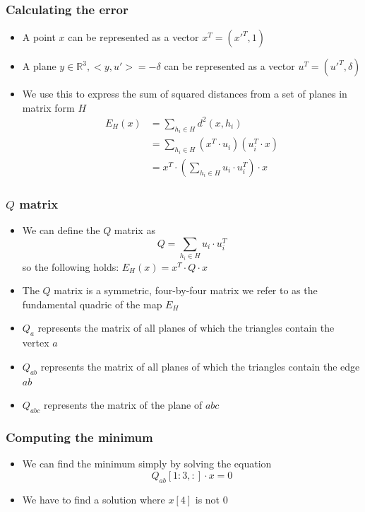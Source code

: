 \documentclass{beamer}
\begin{document}
\begin{frame}[t]
    \frametitle{Calculating the error}
    \begin{itemize}
        \item A point $x$ can be represented as a vector $x^T = (x'^T, 1)$  
        \item A plane $y \in \mathbb{R}^3, <y, u'> = -\delta$ can be represented
        as a vector $u^T = (u'^T, \delta)$
        \item We use this to express the sum of squared distances
        from a set of planes in matrix form $H$
        \begin{align*}
            E_H(x) &= \sum_{h_i \in H} d^2(x, h_i)\\
                   &=\sum_{h_i \in H} (x^T \cdot u_i) (u_i^T \cdot x)\\
                   &= x^T \cdot \left( \sum_{h_i \in H} u_i \cdot u_i^T \right) \cdot x
        \end{align*}
    \end{itemize}
\end{frame}
\begin{frame}[t]
    \frametitle{$Q$ matrix}
    \begin{itemize}
        \item We can define the $Q$ matrix as \[Q = \sum_{h_i \in H} u_i \cdot u_i^T\]
        so the following holds: $E_H(x) = x^T \cdot Q \cdot x$
        \item The $Q$ matrix is a symmetric, four-by-four matrix we refer to as the fundamental quadric of
        the map $E_H$
        \item $Q_a$ represents the matrix of all planes of which the triangles
        contain the vertex $a$
        \item $Q_{ab}$ represents the matrix of all planes of which the triangles
        contain the edge $ab$
        \item $Q_{abc}$ represents the matrix of the plane of $abc$
    \end{itemize}
\end{frame}
\begin{frame}[t]
    \frametitle{Computing the minimum}
    \begin{itemize}
        \item We can find the minimum simply by solving the equation
        \[
            Q_{ab}[1:3, :] \cdot x = 0
        \]
        \item We have to find a solution where $x[4]$ is not 0
    \end{itemize}
\end{frame}
\end{document}
